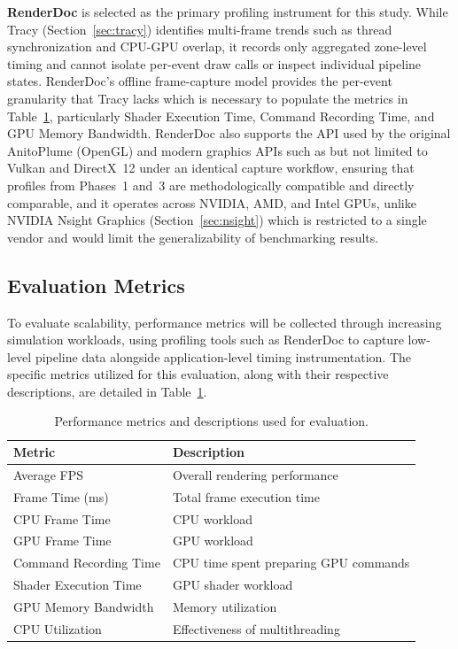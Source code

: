 \textbf{RenderDoc} \cite{renderdoc2023} is selected as the primary profiling instrument for this study. 
While Tracy (Section~\ref{sec:tracy}) identifies multi-frame trends such as thread synchronization and CPU-GPU overlap, it records only aggregated zone-level timing and cannot isolate per-event draw calls or inspect individual pipeline states. RenderDoc's offline frame-capture model provides the per-event granularity that Tracy lacks which is necessary to populate the metrics in Table~\ref{tab:performance_metrics}, particularly Shader Execution Time, Command Recording Time, and GPU Memory Bandwidth. 
RenderDoc also supports the API used by the original AnitoPlume (OpenGL) and modern graphics APIs such as but not limited to Vulkan and DirectX~12 under an identical capture workflow, ensuring that profiles from Phases~1 and~3 are methodologically compatible and directly comparable, and it operates across NVIDIA, AMD, and Intel GPUs, unlike NVIDIA Nsight Graphics (Section~\ref{sec:nsight}) which is restricted to a single vendor and would limit the generalizability of benchmarking results.
\subsection{Evaluation Metrics}
To evaluate scalability, performance metrics will be collected through increasing simulation workloads, using profiling tools such as RenderDoc to capture low-level pipeline data alongside application-level timing instrumentation. 
The specific metrics utilized for this evaluation, along with their respective descriptions, are detailed in Table~\ref{tab:performance_metrics}.

\begin{table}[htbp]
\centering
\renewcommand{\arraystretch}{1} %
\caption{Performance metrics and descriptions used for evaluation.}
\label{tab:performance_metrics}
\begin{tabular}{l p{8cm}}
\hline
\textbf{Metric} & \textbf{Description} \\ 
\hline
Average FPS            & Overall rendering performance \\
Frame Time (ms)        & Total frame execution time \\
CPU Frame Time         & CPU workload \\
GPU Frame Time         & GPU workload \\
Command Recording Time & CPU time spent preparing GPU commands \\
Shader Execution Time  & GPU shader workload \\
GPU Memory Bandwidth   & Memory utilization \\
CPU Utilization        & Effectiveness of multithreading \\
\hline
\end{tabular}
\end{table}

